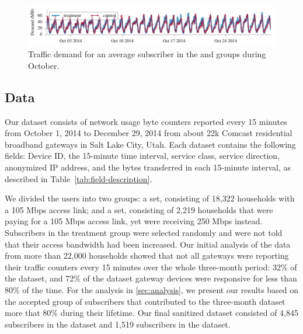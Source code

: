 \begin{figure}[t]
\centering
\includegraphics[width=\linewidth]{figures/traffic_demand_Oct.pdf}
  \caption{Traffic demand for an average subscriber in the \control{} and 
\treatment{} groups during October.\label{fig:traffic-load}}
\end{figure}


\subsection{Data}

Our dataset consists of network usage byte counters reported every 15
minutes from October 1, 2014 to December 29, 2014 from about 22k
Comcast residential broadband gateways in Salt Lake City, Utah. Each
dataset contains the following fields: Device ID, the 15-minute time interval,
service class, service direction, anonymized IP address, and the bytes
transferred in each 15-minute interval, as described in
Table~\ref{tab:field-description}.

We divided the users into two groups: a \control{} set, consisting of
18,322 households with a 105 Mbps access link; and a \treatment{} set,
consisting of 2,219 households that were paying for a 105 Mbps access
link, yet were receiving 250 Mbps instead.  Subscribers in the
treatment group were selected randomly and were not told that their
access bandwidth had been increased.  Our initial analysis of the data
from more than 22,000 households showed that not all gateways were
reporting their traffic counters every 15 minutes over the whole three-month
period: 32\% of the \treatment{} dataset, and 72\% of the \control{} dataset
gateway devices were responsive for less than 80\% of the time. For the
analysis in \autoref{sec:analysis}, we present our results based on the
accepted group of subscribers that contributed to the three-month dataset
more that 80\% during their lifetime. Our final sanitized dataset consisted of
4,845 subscribers in the \control{} dataset and 1,519 subscribers in the
\treatment{} dataset.

